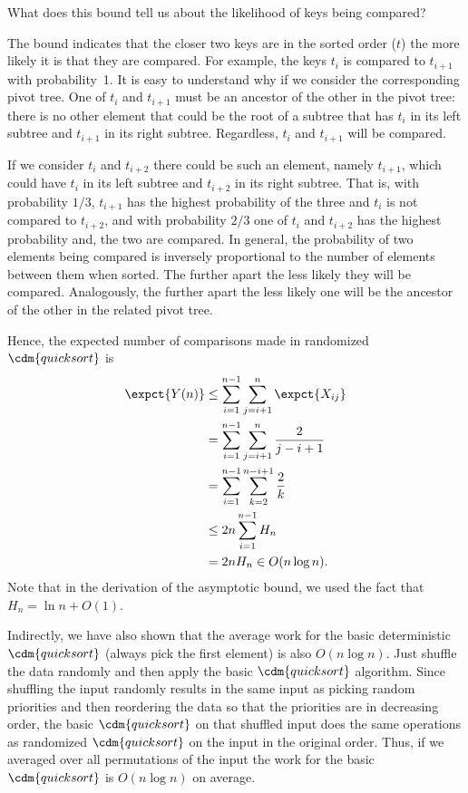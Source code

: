 {\begin{question}
What does this bound tell us about the likelihood of keys being compared? 
\end{question}

The bound indicates that the closer two keys are in the sorted order
($t$) the more likely it is that they are compared.  For example, the
keys $t_i$ is compared to $t_{i+1}$ with probability~1. It is easy to
understand why if we consider the corresponding pivot tree. 
%
One of $t_i$ and $t_{i+1}$ must be an ancestor of the other in the
pivot tree: there is no other element that could be the root of a
subtree that has $t_i$ in its left subtree and $t_{i+1}$ in its right
subtree.
%
Regardless, $t_i$ and $t_{i+1}$ will be compared.

If we consider $t_{i}$ and $t_{i+2}$ there could be such an element,
namely $t_{i+1}$, which could have $t_i$ in its left subtree and
$t_{i+2}$ in its right subtree. That is, with probability $1/3$,
$t_{i+1}$ has the highest probability of the three and $t_i$ is not
compared to $t_{i+2}$, and with probability $2/3$ one of $t_i$ and
$t_{i+2}$ has the highest probability and, the two are compared.  In
general, the probability of two elements being compared is inversely
proportional to the number of elements between them when sorted.  The
further apart the less likely they will be compared.  Analogously, the
further apart the less likely one will be the ancestor of the other in
the related pivot tree.

Hence, the expected number of comparisons made in randomized $\cdm{\qsort{}}$ is
\begin{align*}
  \expct{Y(n)} &\leq \sum_{i=1}^{n-1} \sum_{j=i+1}^n \expct{X_{ij}}
\\
  &= \sum_{i=1}^{n-1}  \sum_{j=i+1}^n \frac{2}{j-i+1}
\\
  &= \sum_{i=1}^{n-1}  \sum_{k=2}^{n-i+1} \frac{2}{k} 
\\
  & \leq 2n \sum_{i=1}^{n-1}  H_n 
\\
  &= 2n H_n \in O(n\log n).
\end{align*}
Note that in the derivation of the asymptotic bound, we used the fact
that $H_n = \ln{n} + O(1)$.

Indirectly, we have also shown that the average work for the basic
deterministic $\cdm{\qsort{}}$ (always pick the first element) is also $O(n
\log n)$.  Just shuffle the data randomly and then apply the basic
$\cdm{\qsort{}}$ algorithm.  Since shuffling the input randomly results in the
same input as picking random priorities and then reordering the data
so that the priorities are in decreasing order, the basic $\cdm{\qsort{}}$ on
that shuffled input does the same operations as randomized $\cdm{\qsort{}}$
on the input in the original order.  Thus, if we averaged over all
permutations of the input the work for the basic $\cdm{\qsort{}}$ is $O(n
\log n)$ on average.


}
